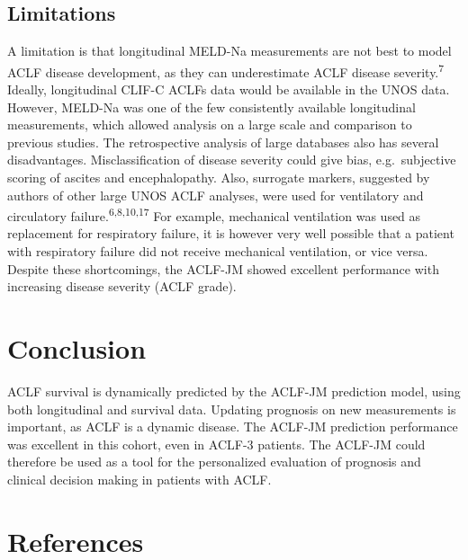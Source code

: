 \documentclass[11pt,english,]{book} %
\begin{document}
\hypertarget{limitations-3}{%
\subsection*{Limitations}\label{limitations-3}}

A limitation is that longitudinal MELD-Na measurements are not best to model ACLF disease development, as they can underestimate ACLF disease severity.\textsuperscript{7} Ideally, longitudinal CLIF-C ACLFs data would be available in the UNOS data. However, MELD-Na was one of the few consistently available longitudinal measurements, which allowed analysis on a large scale and comparison to previous studies. The retrospective analysis of large databases also has several disadvantages. Misclassification of disease severity could give bias, e.g.~subjective scoring of ascites and encephalopathy. Also, surrogate markers, suggested by authors of other large UNOS ACLF analyses, were used for ventilatory and circulatory failure.\textsuperscript{6,8,10,17} For example, mechanical ventilation was used as replacement for respiratory failure, it is however very well possible that a patient with respiratory failure did not receive mechanical ventilation, or vice versa. Despite these shortcomings, the ACLF-JM showed excellent performance with increasing disease severity (ACLF grade).

\hypertarget{conclusion-3}{%
\section*{Conclusion}\label{conclusion-3}}

ACLF survival is dynamically predicted by the ACLF-JM prediction model, using both longitudinal and survival data. Updating prognosis on new measurements is important, as ACLF is a dynamic disease. The ACLF-JM prediction performance was excellent in this cohort, even in ACLF-3 patients. The ACLF-JM could therefore be used as a tool for the personalized evaluation of prognosis and clinical decision making in patients with ACLF.

\newpage
\linespread{1}
\small

\hypertarget{references-4}{%
\section*{References}\label{references-4}}
\end{document}
